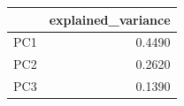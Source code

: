 \begin{tabular}{lr}
\toprule
 & explained\_variance \\
\midrule
PC1 & 0.4490 \\
PC2 & 0.2620 \\
PC3 & 0.1390 \\
\bottomrule
\end{tabular}
